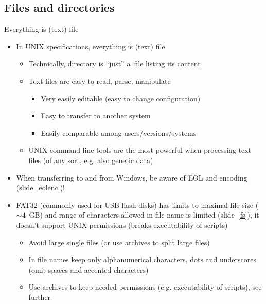 \documentclass[compress, xelatex, 11pt, xcolor=svgnames, aspectratio=169,
	hyperref={
		bookmarks=true,
		unicode=true,
		colorlinks=true,
		pdftitle={Linux, command line and MetaCentrum},
		plainpages=false,
		pdfauthor={Vojtech Zeisek},
		pdfsubject={Course about use of Linux command line, writing shell scripts and using MetaCentrum of CESNET},
		pdfcreator={XeLaTeX},
		pdfkeywords={Linux, GNU, BASH, shell, command line, MetaCentrum},
		linkcolor=DarkRed, %
		anchorcolor=DarkBlue, %
		citecolor=Indigo, %
		filecolor=NavyBlue, %
		menucolor=DarkMagenta, %
		urlcolor=DarkBlue, %
		},
	url={hyphens, lowtilde} %
	]{beamer}
\begin{document}
\subsection{Files and directories}

\begin{frame}{Everything is (text) file}
	\begin{itemize}
		\item In UNIX specifications, everything is (text) file
		\begin{itemize}
			\item Technically, directory is \enquote{just} a~file listing its content
			\item Text files are easy to read, parse, manipulate
			\begin{itemize}
				\item Very easily editable (easy to change configuration)
				\item Easy to transfer to another system
				\item Easily comparable among users/versions/systems
			\end{itemize}
			\item UNIX command line tools are the most powerful when processing text files (of any sort, e.g. also genetic data)
		\end{itemize}
		\item When transferring to and from Windows, be aware of EOL and encoding (slide~\ref{eolenc})!
		\item FAT32 (commonly used for USB flash disks) has limits to maximal file size ($\sim4$~GB) and range of characters allowed in file name is limited (slide~\ref{fs}), it doesn't support UNIX permissions (breaks executability of scripts)
		\begin{itemize}
			\item Avoid large single files (or use archives to split large files)
			\item In file names keep only alphanumerical characters, dots and underscores (omit spaces and accented characters)
			\item Use archives to keep needed permissions (e.g. executability of scripts), see further
		\end{itemize}
		\end{itemize}
\end{frame}
\end{document}
